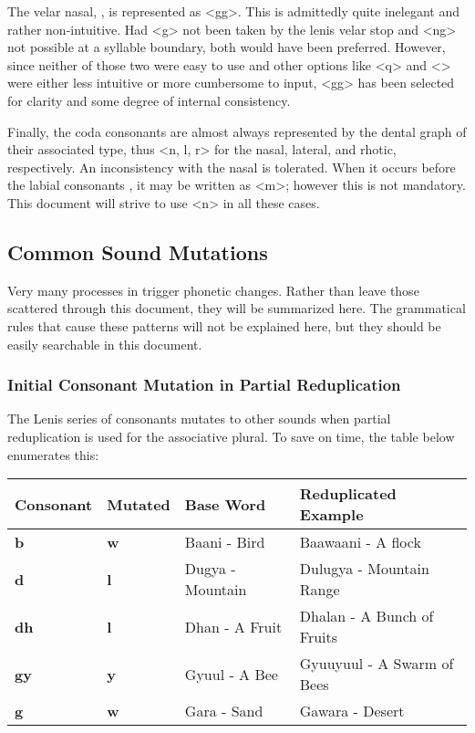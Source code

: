   The velar nasal, \phonemic{\engma}, is represented as <gg>. This is admittedly quite inelegant and rather non-intuitive. Had <g> not been taken by the lenis velar stop and <ng> not possible at a syllable boundary, both would have been preferred. However, since neither of those two were easy to use and other options like <q> and <> were either less intuitive or more cumbersome to input, <gg> has been selected for clarity and some degree of internal consistency.\par
  Finally, the coda consonants are almost always represented by the dental graph of their associated type, thus <n, l, r> for the nasal, lateral, and rhotic, respectively. An inconsistency with the nasal is tolerated. When it occurs before the labial consonants , it may be written as <m>; however this is not mandatory. This document will strive to use <n> in all these cases.\par

  \subsection{Common Sound Mutations}
  Very many processes in \langname trigger phonetic changes. Rather than leave those scattered through this document, they will be summarized here. The grammatical rules that cause these patterns will not be explained here, but they should be easily searchable in this document.

  \subsubsection{Initial Consonant Mutation in Partial Reduplication}
  The Lenis series of consonants mutates to other sounds when partial reduplication is used for the associative plural. To save on time, the table below enumerates this: 

  \vertspace
  \begin{tabular}{|l|l|l|l|}
    \hline
    Consonant   & Mutated    & Base Word        & Reduplicated Example         \\ \hline \hline
    \textbf{b}  & \textbf{w} & Baani - Bird     & Baawaani - A flock           \\
    \textbf{d}  & \textbf{l} & Dugya - Mountain & Dulugya  - Mountain Range    \\
    \textbf{dh} & \textbf{l} & Dhan  - A Fruit  & Dhalan   - A Bunch of Fruits \\
    \textbf{gy} & \textbf{y} & Gyuul - A Bee    & Gyuuyuul - A Swarm of Bees   \\
    \textbf{g}  & \textbf{w} & Gara  - Sand     & Gawara   - Desert            \\ \hline
  \end{tabular}


